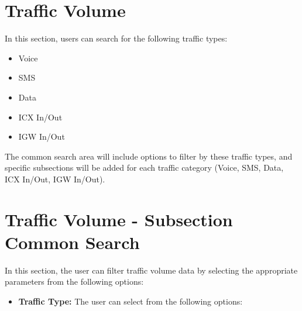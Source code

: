 \section{Traffic Volume}

In this section, users can search for the following traffic types:

\begin{itemize}
  \item Voice
  \item SMS
  \item Data
  \item ICX In/Out
  \item IGW In/Out
\end{itemize}

The common search area will include options to filter by these traffic types, and specific subsections will be added for each traffic category (Voice, SMS, Data, ICX In/Out, IGW In/Out).
\section{Traffic Volume - Subsection Common Search}

In this section, the user can filter traffic volume data by selecting the appropriate parameters from the following options:

\begin{itemize}
  \item \textbf{Traffic Type:} The user can select from the following options:
\end{itemize}

